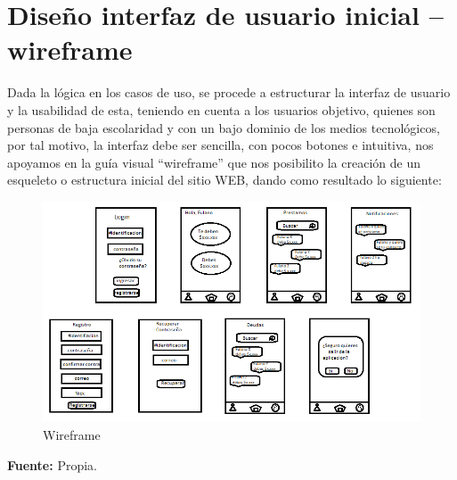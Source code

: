 \section{Diseño interfaz de usuario inicial – wireframe}

{Dada la lógica en los casos de uso, se procede a estructurar la interfaz de usuario y la usabilidad de esta, teniendo en cuenta a los usuarios objetivo, quienes son personas de baja escolaridad y con un bajo dominio de los medios tecnológicos, por tal motivo, la interfaz debe ser sencilla, con pocos botones e intuitiva, nos apoyamos en la guía visual “wireframe” que nos posibilito la creación de un esqueleto o estructura inicial del sitio WEB, dando como resultado lo siguiente:

\begin{figure}[H]
	\centering
	\includegraphics[width=1\linewidth]{development/wireframe.png}
	\caption{Wireframe}
\end{figure}
\begin{center}
	\textbf{Fuente:} Propia.
\end{center}
}